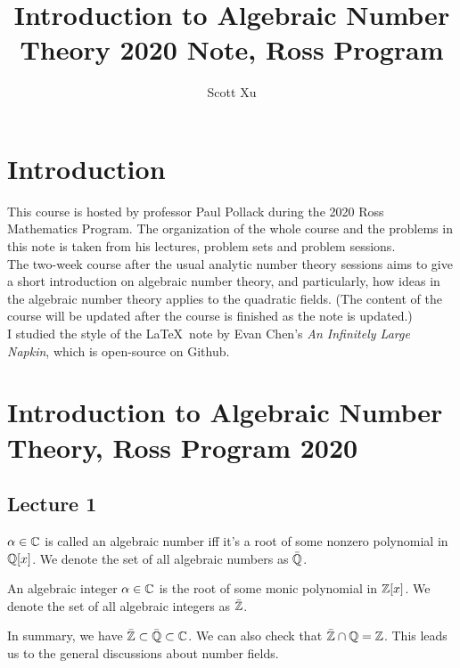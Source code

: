 \documentclass[12pt,twoside=semi,openright,numbers=noenddot]{scrbook}
\title{Introduction to Algebraic Number Theory 2020 Note, Ross Program}
\author{Scott Xu}
\date{}
\begin{document}
\maketitle
\tableofcontents
\setcounter{chapter}{-1}

\chapter{Introduction}
    \noindent
    This course is hosted by professor Paul Pollack during the 2020 Ross Mathematics Program. The organization of the whole course and 
    the problems in this note is taken from his lectures, problem sets and problem sessions. \\
    \newline
    The two-week course after the usual analytic number theory sessions aims to give a short introduction on algebraic number theory, 
    and particularly, how ideas in the algebraic number theory applies to the quadratic fields. (The content of the course will be updated 
    after the course is finished as the note is updated.) \\
    \newline
    I studied the style of the \LaTeX \ note by Evan Chen's \emph{An Infinitely Large Napkin}, which is open-source on Github.

\chapter{Introduction to Algebraic Number Theory, Ross Program 2020}
\section{Lecture 1}
\begin{definition}
    $\alpha \in \mathbb C$ is called an algebraic number iff it's a root of some nonzero polynomial in $\mathbb Q[x]$. We denote the set of all 
    algebraic numbers as $\bar{\mathbb Q}$.
\end{definition}
\begin{definition}
    An algebraic integer $\alpha \in \mathbb C$ is the root of some monic polynomial in $\mathbb Z[x]$.
    We denote the set of all algebraic integers as $\bar{\mathbb Z}$. 
\end{definition}
In summary, we have $\bar{\mathbb Z} \subset \bar{\mathbb Q} \subset \mathbb C$. We can also check that 
$\bar{\mathbb Z} \cap \mathbb Q = \mathbb Z$. This leads us to the general discussions about number fields.\\
\end{document}
